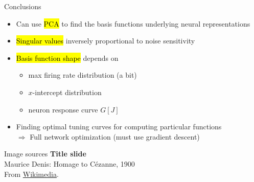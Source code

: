 \documentclass[handout,aspectratio=169]{beamer}
\begin{document}
	\begin{frame}{Conclusions}
		\begin{itemize}
			\setlength{\itemsep}{0.5cm}
			\item Can use \hl{PCA} to find the basis functions underlying neural representations
			\item \hl{Singular values} inversely proportional to noise sensitivity
			\item \hl{Basis function shape} depends on\\[0.25cm]
			\begin{itemize}
				\setlength{\itemsep}{0.25cm}
				\item max firing rate distribution (a bit)
        \item $x$-intercept distribution
				\item neuron response curve $G[J]$
			\end{itemize}
			\item Finding optimal tuning curves for computing particular functions\\
			$\Rightarrow$ Full network optimization (must use gradient descent)
		\end{itemize}
	\end{frame}

	\backupbegin

	\begin{frame}[noframenumbering]{Image sources}
		\small
		\textbf{Title slide}\\Maurice Denis: Homage to Cézanne, 1900\\From \href{https://commons.wikimedia.org/wiki/File:Maurice_Denis_Homage_to_Cezanne_1900.jpg}{Wikimedia}.
	\end{frame}

	\backupend
	
\end{document}
